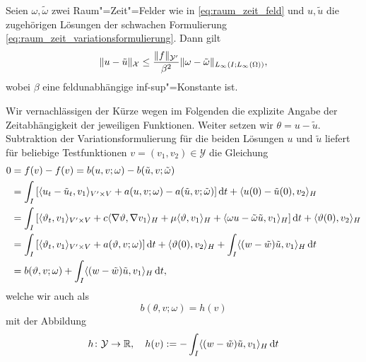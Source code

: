\documentclass[../main.tex]{subfiles}
\begin{document}
\begin{Lemma}
\label{lemma:stabilitaetsaussage}
    Seien $\omega, \tilde{\omega}$ zwei Raum"=Zeit"=Felder wie in \cref{eq:raum_zeit_feld} und $u, \tilde{u}$ die zugehörigen Lösungen der schwachen Formulierung \cref{eq:raum_zeit_variationsformulierung}.
    Dann gilt
    \begin{equation}
        \lVert u - \tilde{u}\rVert_{\mathcal X} \leq \frac{\lVert f\rVert_{\mathcal Y'}}{\beta^{2}} \lVert\omega - \tilde{\omega}\rVert_{L_{\infty}(I; L_{\infty}(\Omega))},
    \end{equation}
    wobei $\beta$ eine feldunabhängige inf-sup"=Konstante ist.

    \begin{Beweis}
        Wir vernachlässigen der Kürze wegen im Folgenden die explizite Angabe der Zeitabhängigkeit der jeweiligen Funktionen.
        Weiter setzen wir $\theta = u - \tilde{u}$.
        Subtraktion der Variationsformulierung für die beiden Lösungen $u$ und $\tilde{u}$ liefert für beliebige Testfunktionen $v = (v_{1}, v_{2}) \in \mathcal Y$ die Gleichung
        \begin{align}
            0
            &= f(v) - f(v) = b(u, v; \omega) - b(\tilde{u}, v; \tilde{\omega})
           \\&= \int_{I} \left[ \langle u_{t} - \tilde{u}_{t},v_{1}\rangle_{V' \times V} + a(u, v; \omega) - a(\tilde{u}, v; \tilde{\omega}) \right] \mathop{}\!\mathrm{d} t + \langle u(0) - \tilde{u}(0),v_{2}\rangle_{H}
           \\&= \int_{I} \left[ \langle\vartheta_{t},v_{1}\rangle_{V' \times V} + c \langle\nabla \vartheta,\nabla v_{1}\rangle_{H} + \mu \langle\vartheta,v_{1}\rangle_{H} + \langle\omega u - \tilde{\omega}\tilde{u},v_{1}\rangle_{H} \right] \mathop{}\!\mathrm{d} t + \langle\vartheta(0),v_{2}\rangle_{H}
           \\&= \int_{I} \left[ \langle\vartheta_{t},v_{1}\rangle_{V' \times V} + a(\vartheta, v; \omega) \right] \mathop{}\!\mathrm{d} t + \langle\vartheta(0),v_{2}\rangle_{H} + \int_{I} \langle(w - \tilde{w})\tilde{u},v_{1}\rangle_{H} \mathop{}\!\mathrm{d} t
           \\&= b(\vartheta, v; \omega) + \int_{I} \langle(w - \tilde{w})\tilde{u},v_{1}\rangle_{H} \mathop{}\!\mathrm{d} t,
        \end{align}
        welche wir auch als
        \begin{equation}
            \label{eq:stabilitaetsaussage:beweis:variationsproblem}
            b(\theta, v; \omega) = h(v)
        \end{equation}
        mit der Abbildung
        \begin{equation}
            h \colon \mathcal Y \to \mathbb{R}, \quad h(v) := - \int_{I} \skp{(w - \tilde{w})\tilde{u}}{v_{1}}{H} \diff t

\end{equation}
\end{Beweis}
\end{Lemma}
\end{document}
